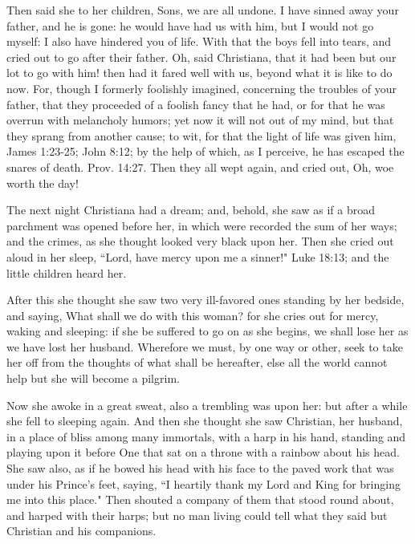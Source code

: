 Then said she to her children, Sons, we are all undone. I have sinned away your father, and he is gone: he would have had us with him, but I would not go myself: I also have hindered you of life. With that the boys fell into tears, and cried out to go after their father. Oh, said Christiana, that it had been but our lot to go with him! then had it fared well with us, beyond what it is like to do now. For, though I formerly foolishly imagined, concerning the troubles of your father, that they proceeded of a foolish fancy that he had, or for that he was overrun with melancholy humors; yet now it will not out of my mind, but that they sprang from another cause; to wit, for that the light of life was given him, James 1:23-25; John 8:12; by the help of which, as I perceive, he has escaped the snares of death. Prov. 14:27. Then they all wept again, and cried out, Oh, woe worth the day!

The next night Christiana had a dream; and, behold, she saw as if a broad parchment was opened before her, in which were recorded the sum of her ways; and the crimes, as she thought looked very black upon her. Then she cried out aloud in her sleep, ``Lord, have mercy upon me a sinner!" Luke 18:13; and the little children heard her.

After this she thought she saw two very ill-favored ones standing by her bedside, and saying, What shall we do with this woman? for she cries out for mercy, waking and sleeping: if she be suffered to go on as she begins, we shall lose her as we have lost her husband. Wherefore we must, by one way or other, seek to take her off from the thoughts of what shall be hereafter, else all the world cannot help but she will become a pilgrim.

Now she awoke in a great sweat, also a trembling was upon her: but after a while she fell to sleeping again. And then she thought she saw Christian, her husband, in a place of bliss among many immortals, with a harp in his hand, standing and playing upon it before One that sat on a throne with a rainbow about his head. She saw also, as if he bowed his head with his face to the paved work that was under his Prince's feet, saying, ``I heartily thank my Lord and King for bringing me into this place." Then shouted a company of them that stood round about, and harped with their harps; but no man living could tell what they said but Christian and his companions.

